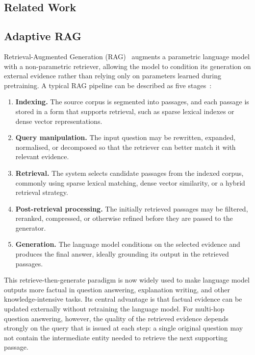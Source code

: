 \documentclass{nthu_thesis}
\begin{document}
\begin{thesiscjk}
\chapter{Related Work}
\label{ch:related}

\section{Adaptive RAG}
\label{sec:adaptive-rag}

Retrieval-Augmented Generation (RAG)~\cite{rag_survey} augments a parametric language model with a non-parametric retriever, allowing the model to condition its generation on external evidence rather than relying only on parameters learned during pretraining. A typical RAG pipeline can be described as five stages~\cite{ragtext_survey}:

\begin{enumerate}
    \item \textbf{Indexing.} The source corpus is segmented into passages, and each passage is stored in a form that supports retrieval, such as sparse lexical indexes or dense vector representations.
    \item \textbf{Query manipulation.} The input question may be rewritten, expanded, normalised, or decomposed so that the retriever can better match it with relevant evidence.
    \item \textbf{Retrieval.} The system selects candidate passages from the indexed corpus, commonly using sparse lexical matching, dense vector similarity, or a hybrid retrieval strategy.
    \item \textbf{Post-retrieval processing.} The initially retrieved passages may be filtered, reranked, compressed, or otherwise refined before they are passed to the generator.
    \item \textbf{Generation.} The language model conditions on the selected evidence and produces the final answer, ideally grounding its output in the retrieved passages.
\end{enumerate}

This retrieve-then-generate paradigm is now widely used to make language model outputs more factual in question answering, explanation writing, and other knowledge-intensive tasks. Its central advantage is that factual evidence can be updated externally without retraining the language model. For multi-hop question answering, however, the quality of the retrieved evidence depends strongly on the query that is issued at each step: a single original question may not contain the intermediate entity needed to retrieve the next supporting passage.


\end{thesiscjk}
\end{document}
